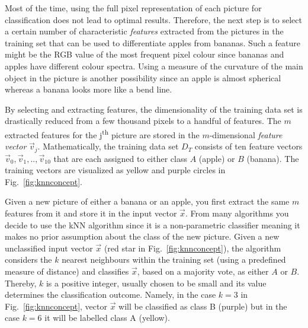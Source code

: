 Most of the time, using the full pixel representation of each picture for classification does not lead to optimal results. Therefore, the next step is to select a certain number of characteristic \emph{features} extracted from the pictures in the training set that can be used to differentiate apples from bananas. Such a feature might be the RGB value of the most frequent pixel colour since bananas and apples have different colour spectra. Using a measure of the curvature of the main object in the picture is another possibility since an apple is almost spherical whereas a banana looks more like a bend line.

By selecting and extracting features, the dimensionality of the training data set is drastically reduced from a few thousand pixels to a handful of features. The $m$ extracted features for the j\textsuperscript{th} picture are stored in the $m$-dimensional \emph{feature vector} $\vec{v}_{j}$. Mathematically, the training data set ${D}_{T}$ consists of ten feature vectors $\vec{v}_{0}, \vec{v}_{1},..,\vec{v}_{10}$ that are each assigned to either class $A$ (apple) or $B$ (banana). The training vectors are visualized as yellow and purple circles in Fig.~\ref{fig:knnconcept}.

Given a new picture of either a banana or an apple, you first extract the same $m$ features from it and store it in the input vector $\vec{x}$. From many algorithms you decide to use the kNN algorithm since it is a non-parametric classifier meaning it makes no prior assumption about the class of the new picture. Given a new unclassified input vector $\vec{x}$ (red star in Fig.~\ref{fig:knnconcept}), the algorithm considers the $k$ nearest neighbours within the training set (using a predefined measure of distance) and classifies $\vec{x}$, based on a majority vote, as either $A$ or $B$. Thereby, $k$ is a positive integer, usually chosen to be small and its value determines the classification outcome. Namely, in the case $k = 3$ in Fig.~\ref{fig:knnconcept}, vector $\vec{x}$ will be classified as class B (purple) but in the case $k = 6$ it will be labelled class A (yellow).

